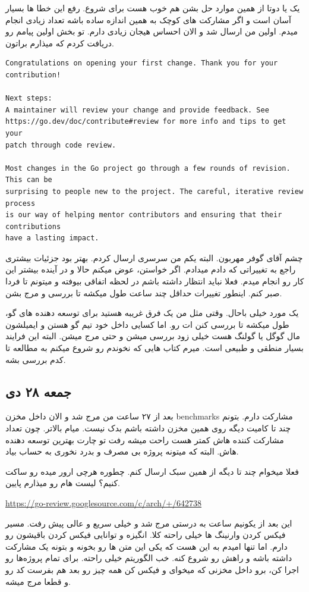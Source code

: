 یک یا دوتا از همین موارد حل بشن هم خوب هست برای شروع. رفع این خطا ها بسیار آسان است و اگر مشارکت های کوچک به همین اندازه ساده باشه تعداد زیادی انجام میدم.
اولین \cl من
ارسال شد و الان احساس هیجان زیادی دارم. تو بخش  اولین پیامم رو دریافت کردم که میذارم براتون.

\begin{latin}
\begin{verbatim}
Congratulations on opening your first change. Thank you for your contribution!

Next steps:
A maintainer will review your change and provide feedback. See
https://go.dev/doc/contribute#review for more info and tips to get your
patch through code review.

Most changes in the Go project go through a few rounds of revision. This can be
surprising to people new to the project. The careful, iterative review process
is our way of helping mentor contributors and ensuring that their contributions
have a lasting impact.
\end{verbatim}
\end{latin}

چشم آقای گوفر مهربون. البته یکم من سرسری ارسال کردم. بهتر بود جزئیات بیشتری راجع به تغییراتی که دادم میدادم.
 اگر خواستن، عوض میکنم حالا و در آینده بیشتر این کار رو انجام میدم.
فعلا نباید انتظار داشته باشم در لحظه اتفاقی بیوفته و میتونم تا فردا صبر کنم. اینطور تغییرات حداقل چند ساعت طول میکشه تا بررسی و مرج بشن.

یک مورد خیلی باحال. وقتی مثل من یک فرق غریبه هستید برای توسعه دهنده های گو، طول میکشه تا بررسی کنن \cl ات رو.
اما کسایی داخل خود تیم گو هستن و ایمیلشون مال گوگل یا گولنگ هست خیلی زود بررسی میشن و حتی مرج میشن.
البته این فرایند بسیار منطقی و طبیعی است. میرم کتاب هایی که نخوندم رو شروع میکنم به مطالعه تا کدم بررسی بشه.

\subsection{جمعه ۲۸ دی}
بعد از ۲۷ ساعت \cl من مرج شد و الان داخل مخزن benchmarks مشارکت دارم. بتونم چند تا کامیت دیگه روی همین مخزن داشته باشم
بدک نیست. میام بالاتر. چون تعداد مشارکت کننده هاش کمتر هست راحت میشه رفت تو چارت بهترین توسعه دهنده هاش.
البته که میتونه پروژه بی مصرف و بدرد نخوری به حساب بیاد.

فعلا میخوام چند تا \cl دیگه از همین سبک ارسال کنم. چطوره هرچی  ارور میده رو ساکت کنیم؟ لیست \cl هام رو میذارم پایین.
\begin{latin}
\url{https://go-review.googlesource.com/c/arch/+/642738}
\end{latin}
این \cl بعد از یکونیم ساعت به درستی مرج شد و خیلی سریع و عالی پیش رفت. مسیر فیکس کردن وارنینگ ها خیلی راحته کلا.
انگیزه و توانایی فیکس کردن باقیشون رو دارم. اما تنها امیدم به این هست که یکی این متن ها رو بخونه و بتونه یک مشارکت داشته باشه
و راهش رو شروع کنه. خب الگوریتم خیلی راحته. برای تمام پروژه‌ها  رو اجرا کن، برو داخل مخزنی که میخوای و
فیکس کن همه چیز رو بعد هم بفرست کد رو و قطعا مرج میشه.

